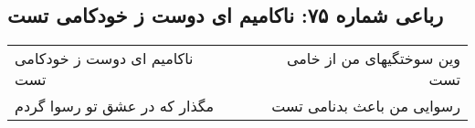 \begin{center}
\section*{رباعی شماره ۷۵: ناکامیم ای دوست ز خودکامی تست}
\label{sec:sh075}
\begin{longtable}{l p{0.5cm} r}
ناکامیم ای دوست ز خودکامی تست
&&
وین سوختگیهای من از خامی تست
\\
مگذار که در عشق تو رسوا گردم
&&
رسوایی من باعث بدنامی تست
\\
\end{longtable}
\end{center}
